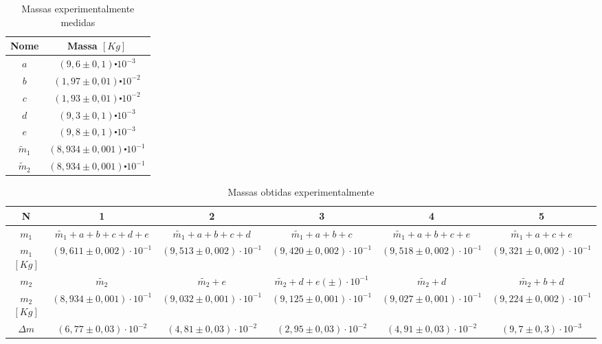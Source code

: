 \documentclass[a4paper]{article}
\providecommand{\tabularnewline}{\\} %
\begin{document}
\begin{table}[!ht]
	\begin{centering}
	\caption{Massas experimentalmente medidas}
	\par\end{centering}
	\centering{}%
	\begin{tabular}{|c|c|}
	\hline 
	Nome & Massa $[Kg]$\tabularnewline		\hline 
	$a$ & $(9,6\pm0,1)\centerdot10^{-3}$\tabularnewline		\hline 
	$b$ & $(1,97\pm0,01)\centerdot10^{-2}$\tabularnewline	\hline 
	$c$ & $(1,93\pm0,01)\centerdot10^{-2}$\tabularnewline	\hline 
	$d$ & $(9,3\pm0,1)\centerdot10^{-3}$\tabularnewline \hline 
	$e$ & $(9,8\pm0,1)\centerdot10^{-3}$\tabularnewline	\hline 
	$\widetilde{m}_{1}$ & $(8,934\pm0,001)\centerdot10^{-1}$\tabularnewline 	\hline 
	$\widetilde{m}_{2}$ & $(8,934\pm0,001)\centerdot10^{-1}$\tabularnewline 	\hline 
	\end{tabular}
\end{table}

\begin{table}[!ht]
	\begin{adjustwidth}{-2.2cm}{-1cm}
		\begin{centering}
		\caption{Massas obtidas experimentalmente}
		\par\end{centering}
		\centering{}%
		\begin{tabular}{|c|c|c|c|c|c|}
		\hline 
		N & 1 & 2 & 3 & 4 & 5\tabularnewline	\hline 
		$m_{1}$ & $\widetilde{m_{1}}+a+b+c+d+e$ & $\widetilde{m_{1}}+a+b+c+d$ & $\widetilde{m_{1}}+a+b+c$ & $\widetilde{m_{1}}+a+b+c+e$ & $\widetilde{m_{1}}+a+c+e$\tabularnewline		\hline 
		$m_{1}$$[Kg]$ & $(9,611\pm0,002)\cdot10^{-1}$ & $(9,513\pm0,002)\cdot10^{-1}$ & $(9,420\pm0,002)\cdot10^{-1}$ & $(9,518\pm0,002)\cdot10^{-1}$ & $(9,321\pm0,002)\cdot10^{-1}$\tabularnewline	\hline 
		$m_{2}$  & $\widetilde{m_{2}}$ & $\widetilde{m_{2}}+e$ & $\widetilde{m_{2}}+d+e$$(\pm)\cdot10^{-1}$ & $\widetilde{m_{2}}+d$ & $\widetilde{m_{2}}+b+d$\tabularnewline	\hline 
		$m_{2}$$[Kg]$ & $(8,934\pm0,001)\cdot10^{-1}$ & $(9,032\pm0,001)\cdot10^{-1}$ & $(9,125\pm0,001)\cdot10^{-1}$ & $(9,027\pm0,001)\cdot10^{-1}$ & $(9,224\pm0,002)\cdot10^{-1}$\tabularnewline	\hline 
		$\Delta m$ & $(6,77\pm0,03)\cdot10^{-2}$ & $(4,81\pm0,03)\cdot10^{-2}$ & $(2,95\pm0,03)\cdot10^{-2}$ & $(4,91\pm0,03)\cdot10^{-2}$ & $(9,7\pm0,3)\cdot10^{-3}$\tabularnewline	\hline 
		\end{tabular}
	\end{adjustwidth}
\end{table}
\end{document}
